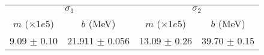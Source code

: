 \begin{tabular}{cc|cc}
\multicolumn{2}{c|}{$\sigma_1$} & \multicolumn{2}{|c}{$\sigma_2$} \\
$m$ ($\times1e5$) & $b$ (MeV) & $m$ ($\times1e5$) & $b$ (MeV) \\
\hline
9.09 $\pm$ 0.10 & 21.911 $\pm$ 0.056 & 13.09 $\pm$ 0.26 & 39.70 $\pm$ 0.15\\
\end{tabular}

